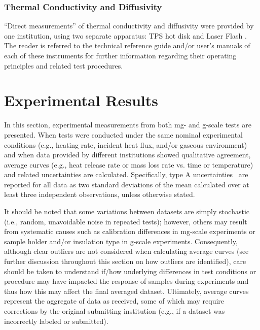 \documentclass{book}
\begin{document}
\subsection{Thermal Conductivity and Diffusivity}

``Direct measurements'' of thermal conductivity and diffusivity were provided by one institution, using two separate apparatus: TPS hot disk \cite{gustafsson1991transient} and Laser Flash \cite{NeztschLFA}. The reader is referred to the technical reference guide and/or user’s manuals of each of these instruments for further information regarding their operating principles and related test procedures.



\chapter{Experimental Results}
\label{exp_results}

In this section, experimental measurements from both mg- and g-scale tests are presented. When tests were conducted under the same nominal experimental conditions (e.g., heating rate, incident heat flux, and/or gaseous environment) and when data provided by different institutions showed qualitative agreement, average curves (e.g., heat release rate or mass loss rate vs. time or temperature) and related uncertainties are calculated. Specifically, type A uncertainties~\cite{taylor1994nist} are reported for all data as two standard deviations of the mean calculated over at least three independent observations, unless otherwise stated.

It should be noted that some variations between datasets are simply stochastic (i.e., random, unavoidable noise in repeated tests); however, others may result from systematic causes such as calibration differences in mg-scale experiments or sample holder and/or insulation type in g-scale experiments. Consequently, although clear outliers are not considered when calculating average curves (see further discussion throughout this section on how outliers are identified), care should be taken to understand if/how underlying differences in test conditions or procedure may have impacted the response of samples during experiments and thus how this may affect the final averaged dataset. Ultimately, average curves represent the aggregate of data as received, some of which may require corrections by the original submitting institution (e.g., if a dataset was incorrectly labeled or submitted).
\end{document}
